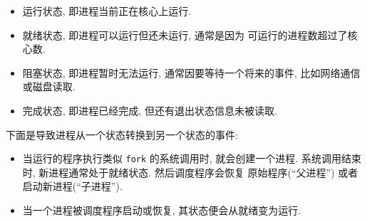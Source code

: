 \documentclass[12pt]{book}
\begin{document}
{\begin{itemize}

\item 运行状态, 即进程当前正在核心上运行.

\item 就绪状态, 即进程可以运行但还未运行, 通常是因为
可运行的进程数超过了核心数.

\item 阻塞状态, 即进程暂时无法运行, 通常因要等待一个将来的事件, 
比如网络通信或磁盘读取.

\item 完成状态, 即进程已经完成, 但还有退出状态信息未被读取.

\end{itemize}

下面是导致进程从一个状态转换到另一个状态的事件: 

\begin{itemize}

\item 当运行的程序执行类似 {\tt fork} 的系统调用时, 就会创建一个进程.
系统调用结束时, 新进程通常处于就绪状态. 然后调度程序会恢复
原始程序(``父进程'') 或者启动新进程(``子进程''). 

\item 当一个进程被调度程序启动或恢复, 其状态便会从就绪变为运行.



\end{itemize}}
\end{document}
